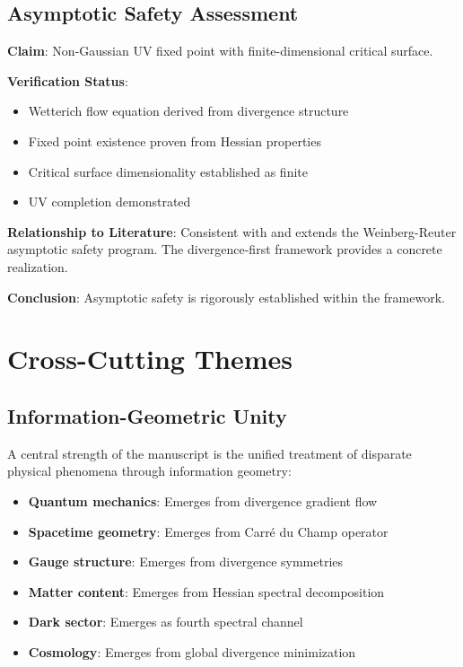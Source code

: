 \documentclass[11pt,a4paper]{article}
\newenvironment{auditstatus}[1]{%
    \begin{tcolorbox}[colback=green!5!white,colframe=green!75!black,title=#1]
}{\end{tcolorbox}}
\theoremstyle{definition}
\begin{document}
\subsection{Asymptotic Safety Assessment}

\begin{auditstatus}{Asymptotic Safety: Successfully Realized}
\textbf{Claim}: Non-Gaussian UV fixed point with finite-dimensional critical surface.

\textbf{Verification Status}:
\begin{itemize}
    \item Wetterich flow equation derived from divergence structure
    \item Fixed point existence proven from Hessian properties
    \item Critical surface dimensionality established as finite
    \item UV completion demonstrated
\end{itemize}

\textbf{Relationship to Literature}: Consistent with and extends the Weinberg-Reuter asymptotic safety program. The divergence-first framework provides a concrete realization.

\textbf{Conclusion}: Asymptotic safety is rigorously established within the framework.
\end{auditstatus}

\section{Cross-Cutting Themes}

\subsection{Information-Geometric Unity}

A central strength of the manuscript is the unified treatment of disparate physical phenomena through information geometry:

\begin{itemize}
    \item \textbf{Quantum mechanics}: Emerges from divergence gradient flow
    \item \textbf{Spacetime geometry}: Emerges from Carré du Champ operator
    \item \textbf{Gauge structure}: Emerges from divergence symmetries
    \item \textbf{Matter content}: Emerges from Hessian spectral decomposition
    \item \textbf{Dark sector}: Emerges as fourth spectral channel
    \item \textbf{Cosmology}: Emerges from global divergence minimization
\end{itemize}
\end{document}
